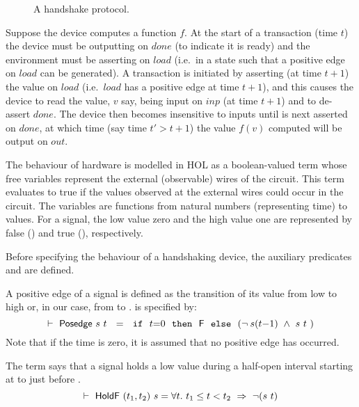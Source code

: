 \documentclass{llncs}
\begin{document}
\begin{figure}[htb]
\hspace*{-13mm}   {}
   \caption{\label{figDev}A handshake protocol.}
\end{figure}


Suppose the device computes a function $f$.  At the start of a
transaction (time $t$) the device must be outputting  on $done$
(to indicate it is ready) and the environment must be asserting
 on $load$ (i.e.~in a state such that a positive edge on $load$
can be generated). A transaction is initiated by asserting (at time
$t{+}1$) the value  on $load$ (i.e.~$load$ has a positive edge
at time $t{+}1$), and this causes the device to read the value, $v$
say, being input on $inp$ (at time $t{+}1$) and to de-assert $done$.
The device then becomes insensitive to inputs until  is next
asserted on $done$, at which time (say time $t' > t{+}1$) the value
$f(v)$ computed will be output on $out$.

The behaviour of hardware is modelled in HOL as a boolean-valued
term whose free variables represent the external (observable) wires
of the circuit. This term evaluates to true if the values 
observed at the external wires could occur in the circuit.
The variables are functions from natural numbers (representing
time) to values. For a signal, the low value zero and
the high value one are represented by false () 
and true (), respectively.

Before specifying the behaviour of a handshaking device,
the auxiliary predicates  and  are defined.

A positive edge of a signal is defined as the transition of its
value from low to high or, in our case, from  to . 
 is specified by:
\[
\TURNST\ \DEF{Posedge}\ s\ t~ ~=~~ \IF{~t{=}0~}{~\DEF{F}~}{~(\NOT\hspace*{0.8mm} s(t{-}1)\ \AND\ s\ t~})
\]
Note that if the time is zero, it is assumed that no positive edge has
occurred.

The term  says that a
signal  holds a low value  during a half-open interval
starting at  to just before .
\[
\TURNST\ \DEF{HoldF}\ (t_1,t_2)\ s = \forall t.\ t_1 \leq t < t_2\ \IMP\ \NOT(s\ t)
\]
\end{document}
